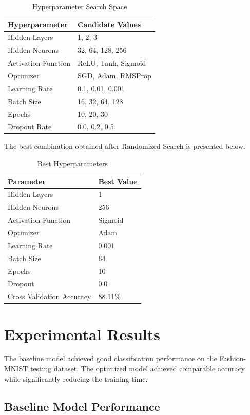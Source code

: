 \documentclass[12pt,a4paper]{article}
\begin{document}
\begin{table}[H]
\centering
\caption{Hyperparameter Search Space}
\begin{tabular}{ll}
\toprule
Hyperparameter & Candidate Values\\
\midrule
Hidden Layers & 1, 2, 3\\
Hidden Neurons & 32, 64, 128, 256\\
Activation Function & ReLU, Tanh, Sigmoid\\
Optimizer & SGD, Adam, RMSProp\\
Learning Rate & 0.1, 0.01, 0.001\\
Batch Size & 16, 32, 64, 128\\
Epochs & 10, 20, 30\\
Dropout Rate & 0.0, 0.2, 0.5\\
\bottomrule
\end{tabular}
\end{table}

The best combination obtained after Randomized Search is presented below.

\begin{table}[H]
\centering
\caption{Best Hyperparameters}
\begin{tabular}{ll}
\toprule
Parameter & Best Value\\
\midrule
Hidden Layers & 1\\
Hidden Neurons & 256\\
Activation Function & Sigmoid\\
Optimizer & Adam\\
Learning Rate & 0.001\\
Batch Size & 64\\
Epochs & 10\\
Dropout & 0.0\\
Cross Validation Accuracy & 88.11\%\\
\bottomrule
\end{tabular}
\end{table}

\section{Experimental Results}

The baseline model achieved good classification performance on the Fashion-MNIST testing dataset. The optimized model achieved comparable accuracy while significantly reducing the training time.

\subsection{Baseline Model Performance}
\end{document}
